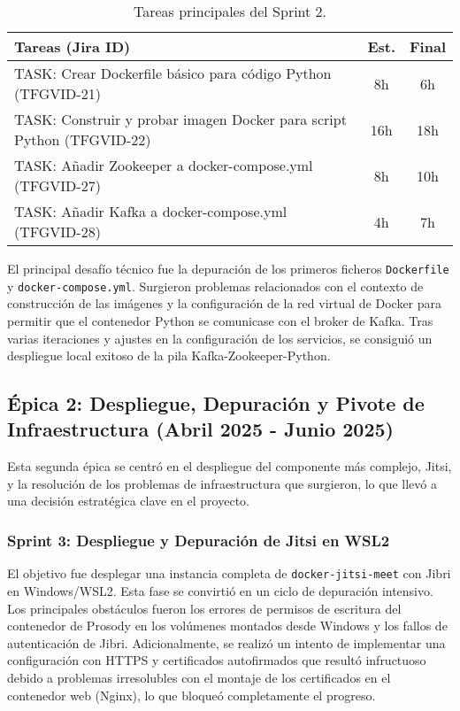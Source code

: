 \begin{table}[H]
    \centering
    \begin{tabular}{|p{}|c|c|}
        \hline
        \rowcolor[HTML]{EFEFEF} 
        \textbf{Tareas (Jira ID)} & \textbf{Est.} & \textbf{Final} \\ \hline
        \rowcolor[HTML]{ECF4FF} 
        TASK: Crear Dockerfile básico para código Python (TFGVID-21) & 8h & 6h \\
        \rowcolor[HTML]{EFEFEF} 
        TASK: Construir y probar imagen Docker para script Python (TFGVID-22) & 16h & 18h \\
        \rowcolor[HTML]{ECF4FF} 
        TASK: Añadir Zookeeper a docker-compose.yml (TFGVID-27) & 8h & 10h \\
        \rowcolor[HTML]{EFEFEF} 
        TASK: Añadir Kafka a docker-compose.yml (TFGVID-28) & 4h & 7h \\
        \hline
    \end{tabular}
    \caption{Tareas principales del Sprint 2.}
    \label{tab:sprint2}
\end{table}

El principal desafío técnico fue la depuración de los primeros ficheros \texttt{Dockerfile} y \texttt{docker-compose.yml}. Surgieron problemas relacionados con el contexto de construcción de las imágenes y la configuración de la red virtual de Docker para permitir que el contenedor Python se comunicase con el broker de Kafka. Tras varias iteraciones y ajustes en la configuración de los servicios, se consiguió un despliegue local exitoso de la pila Kafka-Zookeeper-Python.


\subsection{Épica 2: Despliegue, Depuración y Pivote de Infraestructura (Abril 2025 - Junio 2025)}
\label{epic:2}
Esta segunda épica se centró en el despliegue del componente más complejo, Jitsi, y la resolución de los problemas de infraestructura que surgieron, lo que llevó a una decisión estratégica clave en el proyecto.

\subsubsection{Sprint 3: Despliegue y Depuración de Jitsi en WSL2}
El objetivo fue desplegar una instancia completa de \texttt{docker-jitsi-meet} con Jibri en Windows/WSL2. Esta fase se convirtió en un ciclo de depuración intensivo. Los principales obstáculos fueron los errores de permisos de escritura del contenedor de Prosody en los volúmenes montados desde Windows y los fallos de autenticación de Jibri. Adicionalmente, se realizó un intento de implementar una configuración con HTTPS y certificados autofirmados que resultó infructuoso debido a problemas irresolubles con el montaje de los certificados en el contenedor web (Nginx), lo que bloqueó completamente el progreso.

